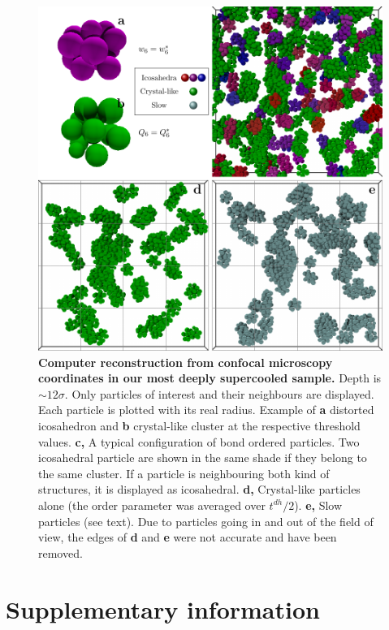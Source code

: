 \begin{figure}
\begin{center}
\includegraphics{generate_figures-figure3.pdf}
\end{center}
\caption{\textbf{Computer reconstruction from confocal microscopy coordinates in our most deeply supercooled sample.} Depth is $\sim 12\sigma$. Only particles of interest and their neighbours are displayed. Each particle is plotted with its real radius.  Example of \textbf{a} distorted icosahedron and \textbf{b} crystal-like cluster at the respective threshold values. \textbf{c,} A typical configuration of bond ordered particles. Two icosahedral particle are shown in the same shade if they belong to the same cluster. If a particle is neighbouring both kind of structures, it is displayed as icosahedral. \textbf{d,} Crystal-like particles alone (the order parameter was averaged over $t^{dh}/2$). \textbf{e,} Slow particles (see text). Due to particles going in and out of the field of view, the edges of \textbf{d} and \textbf{e} were not accurate and have been removed.}
	\label{fig:3D}
\end{figure}
\clearpage
\section*{Supplementary information}

